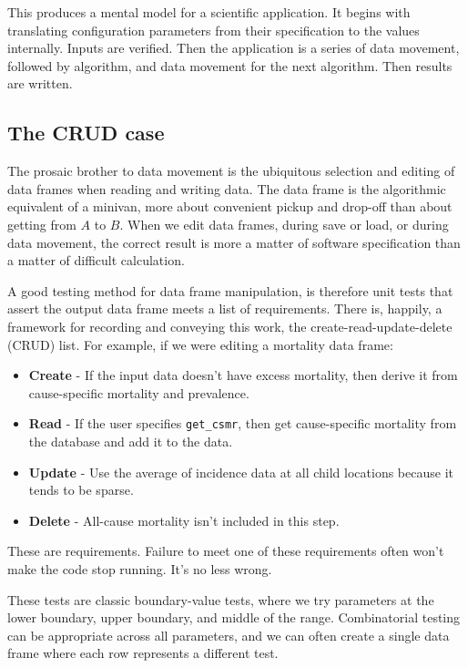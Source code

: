 \documentclass[fleqn,10pt]{olplainarticle}
\begin{document}
This produces a mental model for a scientific application. It begins
with translating configuration parameters from their specification
to the values internally. Inputs are verified. Then the application
is a series of data movement, followed by algorithm, and data movement
for the next algorithm. Then results are written.

\subsection{The CRUD case}\label{sec:crud}

The prosaic brother to data movement is the ubiquitous selection
and editing of data frames when reading and writing data.
The data frame is the algorithmic equivalent of a minivan, more
about convenient pickup and drop-off than about getting from $A$
to $B$. When we edit data frames, during save or load, or during
data movement, the correct result is more a matter of software specification
than a matter of difficult calculation.

A good testing method for data frame manipulation, is therefore
unit tests that assert the output data frame meets a list of requirements.
There is, happily, a framework
for recording and conveying this work, the create-read-update-delete
(CRUD) list. For example, if we were editing a mortality data frame:
\begin{itemize}
\item \textbf{Create} - If the input data doesn't have excess mortality,
  then derive it from cause-specific mortality and prevalence.
\item \textbf{Read} - If the user specifies \lstinline!get_csmr!, then get cause-specific
  mortality from the database and add it to the data.
\item \textbf{Update} - Use the average of incidence data at all child
  locations because it tends to be sparse.
\item \textbf{Delete} - All-cause mortality isn't included in this step.
\end{itemize}
These are requirements. Failure to meet one of these requirements
often won't make the code stop running. It's no less wrong.

These tests are classic boundary-value tests, where
we try parameters at the lower boundary, upper boundary,
and middle of the range. Combinatorial testing can be appropriate
across all parameters, and we can often create a single data frame
where each row represents a different test.
\end{document}
